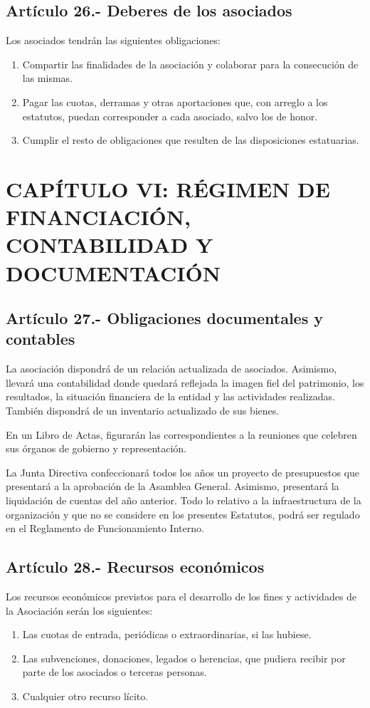 \documentclass[12pt]{article}
\begin{document}
\subsection{Artículo 26.- Deberes de los asociados}
Los asociados tendrán las siguientes obligaciones:
\begin{enumerate}[label=\alph*)]
    \item Compartir las finalidades de la asociación y colaborar para la consecución de las mismas.
    \item Pagar las cuotas, derramas y otras aportaciones que, con arreglo a los estatutos, puedan corresponder a cada asociado, salvo los de honor.
    \item Cumplir el resto de obligaciones que resulten de las disposiciones estatuarias.
\end{enumerate}


\section{CAPÍTULO VI: RÉGIMEN DE FINANCIACIÓN, CONTABILIDAD Y DOCUMENTACIÓN}


\subsection{Artículo 27.- Obligaciones documentales y contables}
La asociación dispondrá de un relación actualizada de asociados. Asimismo, llevará una contabilidad donde quedará reflejada la imagen fiel del patrimonio, los resultados, la situación financiera de la entidad y las actividades realizadas. También dispondrá de un inventario actualizado de sus bienes.

En un Libro de Actas, figurarán las correspondientes a la reuniones que celebren sus órganos de gobierno y representación.

La Junta Directiva confeccionará todos los años un proyecto de presupuestos que presentará a la aprobación de la Asamblea General. Asimismo, presentará la liquidación de cuentas del año anterior. Todo lo relativo a la infraestructura de la organización y que no se considere en los presentes Estatutos, podrá ser regulado en el Reglamento de Funcionamiento Interno.

\subsection{Artículo 28.- Recursos económicos}
Los recursos económicos previstos para el desarrollo de los fines y actividades de la Asociación serán los siguientes:
\begin{enumerate}[label=\alph*)]
    \item Las cuotas de entrada, periódicas o extraordinarias, si las hubiese.
    \item Las subvenciones, donaciones, legados o herencias, que pudiera recibir por parte de los asociados o terceras personas.
    \item Cualquier otro recurso lícito.
\end{enumerate}
\end{document}
